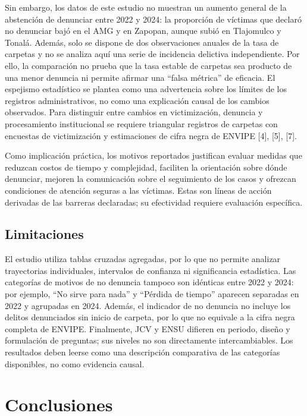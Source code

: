 \documentclass[10pt,twocolumn,letterpaper]{article}
\begin{document}
Sin embargo, los datos de este estudio no muestran un aumento general
de la abstención de denunciar entre 2022 y 2024: la proporción de
víctimas que declaró no denunciar bajó en el AMG y en Zapopan, aunque
subió en Tlajomulco y Tonalá. Además, solo se dispone de dos
observaciones anuales de la tasa de carpetas y no se analiza aquí una
serie de incidencia delictiva independiente. Por ello, la comparación
no prueba que la tasa estable de carpetas sea producto de una menor
denuncia ni permite afirmar una ``falsa métrica'' de eficacia. El
espejismo estadístico se plantea como una advertencia sobre los límites
de los registros administrativos, no como una explicación causal de
los cambios observados. Para distinguir entre cambios en victimización,
denuncia y procesamiento institucional se requiere triangular registros
de carpetas con encuestas de victimización y estimaciones de cifra negra
de ENVIPE [4], [5], [7].

Como implicación práctica, los motivos reportados justifican evaluar
medidas que reduzcan costos de tiempo y complejidad, faciliten la
orientación sobre dónde denunciar, mejoren la comunicación sobre el
seguimiento de los casos y ofrezcan condiciones de atención seguras a
las víctimas. Estas son líneas de acción derivadas de las barreras
declaradas; su efectividad requiere evaluación específica.

\subsection{Limitaciones}

El estudio utiliza tablas cruzadas agregadas, por lo que no permite
analizar trayectorias individuales, intervalos de confianza ni
significancia estadística. Las categorías de motivos de no denuncia
tampoco son idénticas entre 2022 y 2024: por ejemplo, ``No sirve para
nada'' y ``Pérdida de tiempo'' aparecen separadas en 2022 y agrupadas en
2024. Además, el indicador de no denuncia no incluye los delitos
denunciados sin inicio de carpeta, por lo que no equivale a la cifra
negra completa de ENVIPE. Finalmente, JCV y ENSU difieren en periodo,
diseño y formulación de preguntas; sus niveles no son directamente
intercambiables. Los resultados deben leerse como una descripción
comparativa de las categorías disponibles, no como evidencia causal.

\section{Conclusiones}
\end{document}
